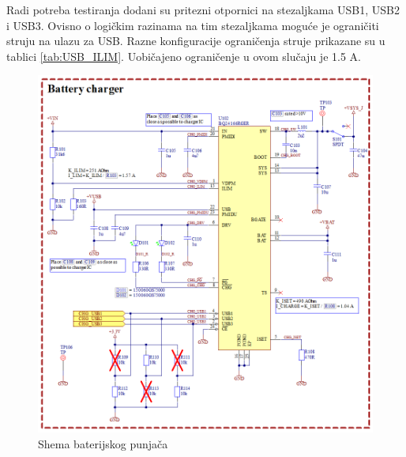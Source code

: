 Radi potreba testiranja dodani su pritezni otpornici na stezaljkama USB1, USB2 i USB3. Ovisno o logičkim razinama na tim stezaljkama moguće je ograničiti struju na ulazu za USB. Razne konfiguracije ograničenja struje prikazane su u tablici \ref{tab:USB_ILIM}. Uobičajeno ograničenje u ovom slučaju je 1.5 A.
\begin{figure}[!htb]
    \centering
    \includegraphics[width = \textwidth]{Figures/MB_BATCHG.png}
    \caption{Shema baterijskog punjača}
    \label{slk:MB_BATCHG}
\end{figure}

